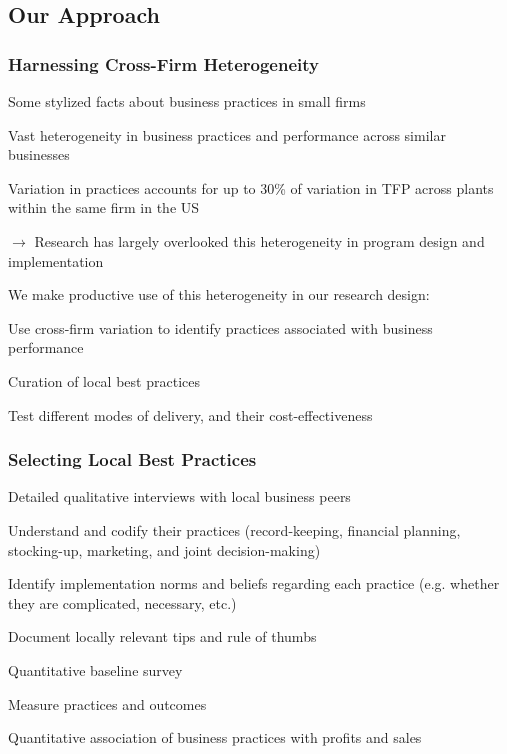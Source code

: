 \documentclass[hideothersubsections, usenames,dvipsnames,11pt]{beamer}
\newenvironment{itemize_2pt}{\itemize\addtolength{\itemsep}{2pt}}{\enditemize}
\begin{document}
\subsection{Our Approach}
\begin{frame}
\frametitle{Harnessing Cross-Firm Heterogeneity}
Some stylized facts about business practices in small firms
\begin{itemize_2pt}
	\item Vast heterogeneity in business practices and performance across similar businesses \citep{deMel2009}
	\item Variation in practices accounts for up to 30\% of variation in TFP across plants within the same firm in the US \citep{Bloom2019}
	\item[] $\rightarrow$ Research has largely overlooked this heterogeneity in program design and implementation
\end{itemize_2pt}

\vspace{0.5em}
\pause

We \textcolor{bdf}{make productive use of this heterogeneity} in our research design: 
\begin{itemize_2pt}
	\item Use cross-firm variation to identify \textcolor{bdf}{practices associated with business performance}
	\item \textcolor{bdf}{Curation} of local best practices
	\item Test different \textcolor{bdf}{modes of delivery}, and their cost-effectiveness
\end{itemize_2pt}

\end{frame}

\begin{frame}
\frametitle{Selecting Local Best Practices}

Detailed \textcolor{bdf}{qualitative interviews} with local business peers
    \begin{itemize_2pt}
    \item Understand and codify their practices (record-keeping, financial planning, stocking-up, marketing, and joint decision-making)
    \item Identify implementation norms and beliefs regarding each practice (e.g. whether they are complicated, necessary, etc.)
    \item Document locally relevant tips and rule of thumbs
    \end{itemize_2pt}
    
\vspace{0.1in}

\textcolor{bdf}{Quantitative baseline survey}
    \begin{itemize_2pt}
    \item Measure practices and outcomes
    \item Quantitative association of business practices with profits and sales
    \end{itemize_2pt}

\end{frame}
\end{document}
